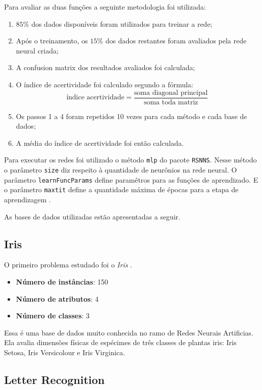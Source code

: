 Para avaliar as duas funções a seguinte metodologia foi utilizada:

\begin{enumerate}
	\item $85\%$ dos dados disponíveis foram utilizados para treinar a rede;
	\item Após o treinamento, os $15\%$ dos dados restantes foram avaliados pela rede neural criada;
	\item A confusion matrix dos resultados avaliados foi calculada;
	\item O índice de acertividade foi calculado segundo a fórmula:
	$$ \text{índice acertividade} = \frac{\text{soma diagonal principal}}{\text{soma toda matriz}} $$
	\item Os passos 1 a 4 foram repetidos 10 vezes para cada método e cada base de dados;
	\item A média do índice de acertividade foi então calculada.
\end{enumerate}

Para executar os redes foi utilizado o método \texttt{mlp} do pacote \texttt{RSNNS}. Nesse método o parâmetro \texttt{size} diz respeito à quantidade de neurônios na rede neural. O parâmetro \texttt{learnFuncParams} define paramêtros para as funções de aprendizado. E o parâmetro \texttt{maxtit} define a quantidade máxima de épocas para a etapa de aprendizagem \cite{bib-rsnns}.

As bases de dados utilizadas estão apresentadas a seguir.

\subsection{Iris}

O primeiro problema estudado foi o \emph{Iris} \cite{bib-iris}.

\begin{itemize}	
	\item \textbf{Número de instâncias}: 150
	\item \textbf{Número de atributos}: 4
	\item \textbf{Número de classes}: 3
\end{itemize}

Essa é uma base de dados muito conhecida no ramo de Redes Neurais Artificias. Ela avalia dimensões físicas de espécimes de três classes de plantas iris: Iris Setosa, Iris Versicolour e Iris Virginica.

\subsection{Letter Recognition}

